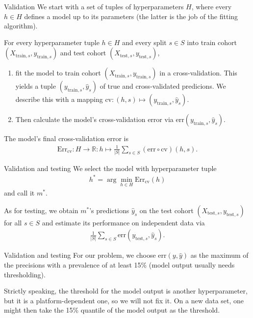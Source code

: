 \documentclass[10pt, aspectratio=169]{beamer}
\def\RR{\mathbb{R}}
\begin{document}
\begin{frame}{Validation}
  We start with a set of tuples of hyperparameters $H$, where every $h \in H$ 
  defines a model up to its parameters (the latter is the job of the fitting 
  algorithm).

  For every hyperparameter tuple $h \in H$ and every split $s \in S$ into train 
  cohort $(X_{\text{train}, s}, y_{\text{train}, s})$ and test cohort 
  $(X_{\text{test}, s}, y_{\text{test}, s})$,

  \begin{enumerate}
    \item fit the model to train cohort $(X_{\text{train}, s}, y_{\text{train}, s})$
    in a cross-validation. This yields a tuple $(y_{\text{train}, s}, \hat{y}_s)$
    of true and cross-validated predicions. We describe this with a mapping 
    $\text{cv}: (h, s) \mapsto (y_{\text{train}, s}, \hat{y}_s)$.
    \item Then calculate the model's cross-validation error via $\text{err}(
      y_{\text{train}, s}, \hat{y}_s)$.
  \end{enumerate}

  The model's final cross-validation error is
  \begin{align*}
    \text{Err}_{\text{cv}}: H \to \RR: h \mapsto \frac{1}{|S|} \sum_{s \in S} 
      (\text{err} \circ \text{cv})(h, s).
  \end{align*}
\end{frame}

\begin{frame}{Validation and testing}
  We select the model with hyperparameter tuple
  \begin{align*}
    h^* = \arg \min_{h \in H} \text{Err}_{\text{cv}}(h)
  \end{align*}
  and call it $m^*$.

  As for testing, we obtain $m^*$'s predictions $\hat{y}_s$ on the test cohort 
  $(X_{\text{test}, s}, y_{\text{test}, s})$ for all $s \in S$ and estimate 
  its performance on independent data via
  \begin{align*}
    \frac{1}{|S|} \sum_{s \in S} \text{err}(y_{\text{test}, s}, \hat{y}_s).
  \end{align*}
\end{frame}

\begin{frame}{Validation and testing}
  For our problem, we choose $\text{err}(y, \hat{y})$ as the maximum of the precisions
  with a prevalence of at least 15\% (model output usually needs thresholding).

  Strictly speaking, the threshold for the model output is another hyperparameter, 
  but it is a platform-dependent one, so we will not fix it. On a new data set,
  one might then take the 15\% quantile of the model output as the threshold.
\end{frame}
\end{document}
